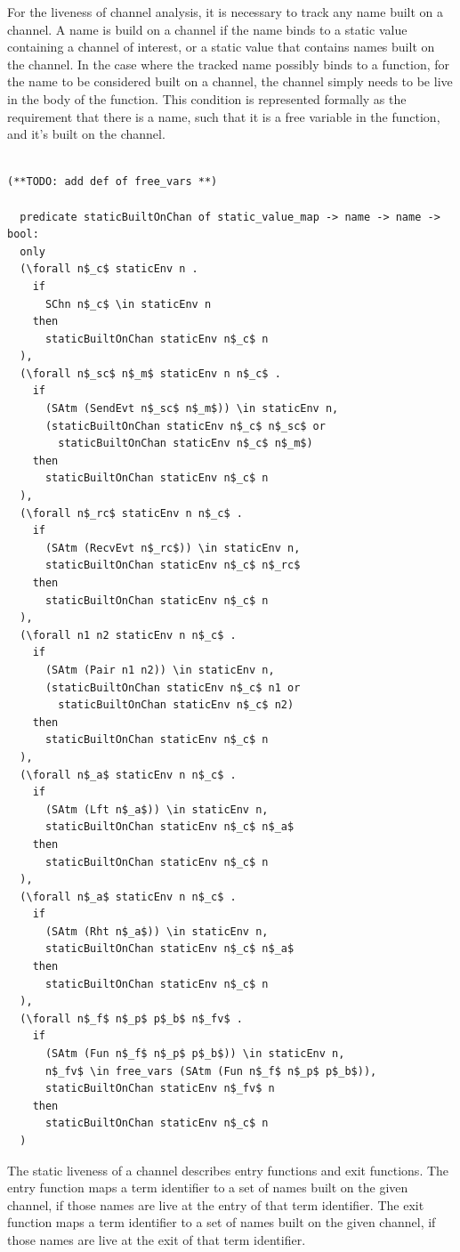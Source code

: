 \documentclass[10pt]{article}
\begin{document}
For the liveness of channel analysis, it is necessary to track any name built on a channel.
A name is build on a channel if the name binds to a static value 
containing a channel of interest, or a static value that contains names built on the channel.
In the case where the tracked name possibly binds to a function,
for the name to be considered built on a channel,
the channel simply needs to be live in the body of the function.
This condition is represented formally as the requirement that there is a 
name, such that it is a free variable in the function, and it's built on the channel.

\begin{lstlisting}[language=logic, mathescape]

(**TODO: add def of free_vars **)

  predicate staticBuiltOnChan of static_value_map -> name -> name -> bool:
  only
  (\forall n$_c$ staticEnv n .
    if 
      SChn n$_c$ \in staticEnv n 
    then 
      staticBuiltOnChan staticEnv n$_c$ n
  ),
  (\forall n$_sc$ n$_m$ staticEnv n n$_c$ . 
    if
      (SAtm (SendEvt n$_sc$ n$_m$)) \in staticEnv n,
      (staticBuiltOnChan staticEnv n$_c$ n$_sc$ or
        staticBuiltOnChan staticEnv n$_c$ n$_m$)
    then 
      staticBuiltOnChan staticEnv n$_c$ n
  ),
  (\forall n$_rc$ staticEnv n n$_c$ . 
    if  
      (SAtm (RecvEvt n$_rc$)) \in staticEnv n,
      staticBuiltOnChan staticEnv n$_c$ n$_rc$
    then 
      staticBuiltOnChan staticEnv n$_c$ n
  ),
  (\forall n1 n2 staticEnv n n$_c$ . 
    if  
      (SAtm (Pair n1 n2)) \in staticEnv n,
      (staticBuiltOnChan staticEnv n$_c$ n1 or
        staticBuiltOnChan staticEnv n$_c$ n2)
    then 
      staticBuiltOnChan staticEnv n$_c$ n
  ),
  (\forall n$_a$ staticEnv n n$_c$ .
    if
      (SAtm (Lft n$_a$)) \in staticEnv n,
      staticBuiltOnChan staticEnv n$_c$ n$_a$
    then 
      staticBuiltOnChan staticEnv n$_c$ n
  ),
  (\forall n$_a$ staticEnv n n$_c$ .
    if
      (SAtm (Rht n$_a$)) \in staticEnv n,
      staticBuiltOnChan staticEnv n$_c$ n$_a$
    then 
      staticBuiltOnChan staticEnv n$_c$ n
  ),
  (\forall n$_f$ n$_p$ p$_b$ n$_fv$ .
    if
      (SAtm (Fun n$_f$ n$_p$ p$_b$)) \in staticEnv n,
      n$_fv$ \in free_vars (SAtm (Fun n$_f$ n$_p$ p$_b$)),
      staticBuiltOnChan staticEnv n$_fv$ n
    then
      staticBuiltOnChan staticEnv n$_c$ n
  )
\end{lstlisting}


The static liveness of a channel describes entry functions and exit functions.
The entry function maps a term identifier to a set of names built on
the given channel, if those names are live at the entry of that term identifier.
The exit function maps a term identifier to a
set of names built on the given channel, if those names are live at the exit of that
term identifier.
\end{document}
